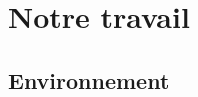 \documentclass[draft]{llncs}
\begin{document}









\section{Notre travail}





\subsection{Environnement}
 
\end{document}
